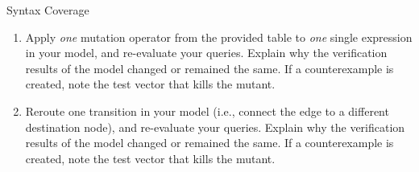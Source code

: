 \documentclass[a4paper]{scrreprt}
\newcounter{question}
\begin{document}
\begin{question}{Syntax Coverage}
\begin{enumerate}[topsep=0pt, leftmargin=*]
    \item Apply \textit{one} mutation operator from the provided table to \textit{one} single expression in your model, and re-evaluate your queries. Explain why the verification results of the model changed or remained the same. If a counterexample is created, note the test vector that kills the mutant.
          \begin{answer}
          \end{answer}

    \item Reroute one transition in your model (i.e., connect the edge to a different destination node), and re-evaluate your queries. Explain why the verification results of the model changed or remained the same. If a counterexample is created, note the test vector that kills the mutant.
          \begin{answer}
          \end{answer}

  \end{enumerate}
\end{question}
\end{document}

